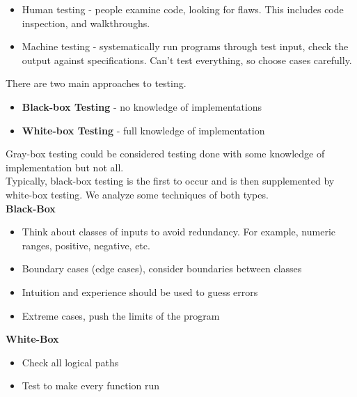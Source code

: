 \documentclass[english, 11pt]{article}
\begin{document}
    \begin{itemize}
      \item Human testing - people examine code, looking for flaws. This includes code inspection, and walkthroughs.
      \item Machine testing - systematically run programs through test input, check the output against specifications. Can't test everything, so choose cases carefully.
    \end{itemize}

    There are two main approaches to testing.

    \begin{itemize}
      \item \textbf{Black-box Testing} - no knowledge of implementations
      \item \textbf{White-box Testing} - full knowledge of implementation
    \end{itemize}

    Gray-box testing could be considered testing done with some knowledge of implementation but not all. \\
    Typically, black-box testing is the first to occur and is then supplemented by white-box testing. We analyze some techniques of both types. \\

    \textbf{Black-Box}
    \begin{itemize}
      \item Think about classes of inputs to avoid redundancy. For example, numeric ranges, positive, negative, etc.
      \item Boundary cases (edge cases), consider boundaries between classes
      \item Intuition and experience should be used to guess errors
      \item Extreme cases, push the limits of the program
    \end{itemize}

    \textbf{White-Box}
    \begin{itemize}
      \item Check all logical paths
      \item Test to make every function run
    \end{itemize}
\end{document}

